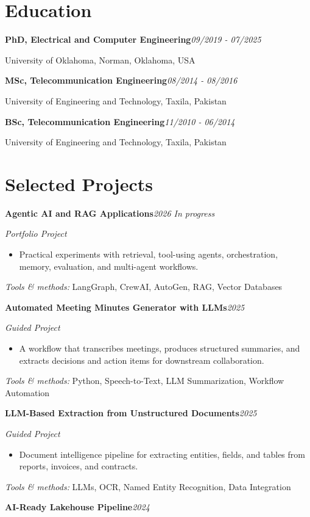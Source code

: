 \documentclass[9pt,letterpaper]{extarticle}
\newcommand{\entry}[2]{\Needspace{4\baselineskip}\textbf{#1}\hfill\textit{#2}\par}
\begin{document}
\section{Education}
\entry{PhD, Electrical and Computer Engineering}{09/2019 - 07/2025}
University of Oklahoma, Norman, Oklahoma, USA\par
\entry{MSc, Telecommunication Engineering}{08/2014 - 08/2016}
University of Engineering and Technology, Taxila, Pakistan\par
\entry{BSc, Telecommunication Engineering}{11/2010 - 06/2014}
University of Engineering and Technology, Taxila, Pakistan\par
{}
\section{Selected Projects}
\entry{Agentic AI and RAG Applications}{2026 \textbar{} In progress}
\textit{Portfolio Project}\par
\begin{itemize}
\item Practical experiments with retrieval, tool-using agents, orchestration, memory, evaluation, and multi-agent workflows.
\end{itemize}
{\small\textit{Tools \& methods:} LangGraph, CrewAI, AutoGen, RAG, Vector Databases\par}
\entry{Automated Meeting Minutes Generator with LLMs}{2025}
\textit{Guided Project}\par
\begin{itemize}
\item A workflow that transcribes meetings, produces structured summaries, and extracts decisions and action items for downstream collaboration.
\end{itemize}
{\small\textit{Tools \& methods:} Python, Speech-to-Text, LLM Summarization, Workflow Automation\par}
\entry{LLM-Based Extraction from Unstructured Documents}{2025}
\textit{Guided Project}\par
\begin{itemize}
\item Document intelligence pipeline for extracting entities, fields, and tables from reports, invoices, and contracts.
\end{itemize}
{\small\textit{Tools \& methods:} LLMs, OCR, Named Entity Recognition, Data Integration\par}
\entry{AI-Ready Lakehouse Pipeline}{2024}
\end{document}
